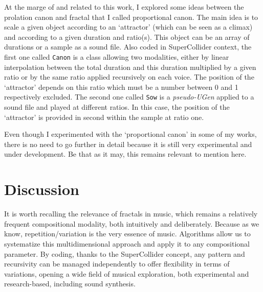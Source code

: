 \documentclass{article}
\begin{document}
At the marge of and related to this work, I explored some ideas between the prolation canon and fractal that I called proportional canon. 
The main idea is to scale a given object according to an `attractor'  (which can be seen as a climax) and according to a given duration and ratio(s).
This object can be an array of durations or a sample as a sound file.
Also coded in SuperCollider context, the first one called \texttt{Canon}\cite[Section 6.2]{yx} is a class allowing two modalities, either by linear interpolation between the total duration and this duration multiplied by a given ratio or by the same ratio applied recursively on each voice. The position of the `attractor'  depends on this ratio which must be a number between 0 and 1 respectively excluded. The second one called \texttt{Sow}\cite[Section 7.4]{yx} is a \textsl{pseudo-UGen} applied to a sound file and played at different ratios. In this case, the position of the `attractor' is provided in second within the sample at ratio one.

Even though I experimented with the `proportional canon' in some of my works, there is no need to go further in detail because it is still very experimental and under development. Be that as it may, this remains relevant to mention here.


\section*{Discussion}

It is worth recalling the relevance of fractals in music, which remains a relatively frequent compositional modality, both intuitively and deliberately. Because as we know, repetition/variation is the very essence of music. Algorithms allow us to systematize this multidimensional approach and apply it to any compositional parameter. By coding, thanks to the SuperCollider concept, any pattern and recursivity can be managed independently to offer flexibility in terms of variations, opening a wide field of musical exploration, both experimental and research-based, including sound synthesis. 
\bigskip
\end{document}
